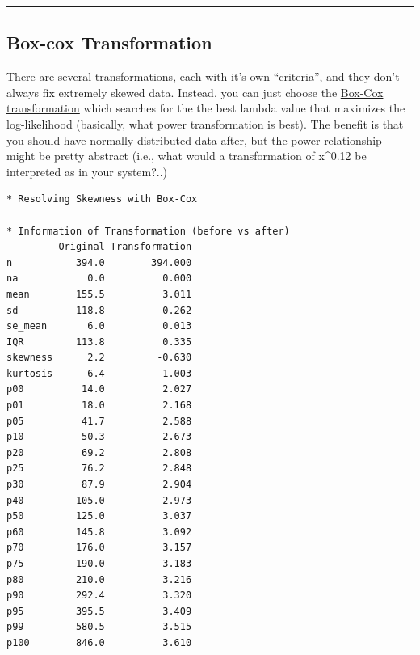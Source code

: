 \documentclass[
  letterpaper,
  DIV=11,
  numbers=noendperiod]{scrreprt}
\newenvironment{Shaded}{\begin{snugshade}}{\end{snugshade}}
\newcommand{\AttributeTok}[1]{\textcolor[rgb]{0.40,0.45,0.13}{#1}}
\newcommand{\FunctionTok}[1]{\textcolor[rgb]{0.28,0.35,0.67}{#1}}
\newcommand{\NormalTok}[1]{\textcolor[rgb]{0.00,0.23,0.31}{#1}}
\newcommand{\OtherTok}[1]{\textcolor[rgb]{0.00,0.23,0.31}{#1}}
\newcommand{\SpecialCharTok}[1]{\textcolor[rgb]{0.37,0.37,0.37}{#1}}
\newcommand{\StringTok}[1]{\textcolor[rgb]{0.13,0.47,0.30}{#1}}
\begin{document}
\begin{center}\rule{0.5\linewidth}{0.5pt}\end{center}

\hypertarget{box-cox-transformation}{%
\subsection{Box-cox Transformation}\label{box-cox-transformation}}

There are several transformations, each with it's own ``criteria'', and
they don't always fix extremely skewed data. Instead, you can just
choose the
\href{https://en.wikipedia.org/wiki/Box\%E2\%80\%93Cox_distribution}{Box-Cox
transformation} which searches for the the best lambda value that
maximizes the log-likelihood (basically, what power transformation is
best). The benefit is that you should have normally distributed data
after, but the power relationship might be pretty abstract (i.e., what
would a transformation of x\^{}0.12 be interpreted as in your system?..)

\begin{Shaded}
\end{Shaded}

\begin{verbatim}
* Resolving Skewness with Box-Cox

* Information of Transformation (before vs after)
         Original Transformation
n           394.0        394.000
na            0.0          0.000
mean        155.5          3.011
sd          118.8          0.262
se_mean       6.0          0.013
IQR         113.8          0.335
skewness      2.2         -0.630
kurtosis      6.4          1.003
p00          14.0          2.027
p01          18.0          2.168
p05          41.7          2.588
p10          50.3          2.673
p20          69.2          2.808
p25          76.2          2.848
p30          87.9          2.904
p40         105.0          2.973
p50         125.0          3.037
p60         145.8          3.092
p70         176.0          3.157
p75         190.0          3.183
p80         210.0          3.216
p90         292.4          3.320
p95         395.5          3.409
p99         580.5          3.515
p100        846.0          3.610
\end{verbatim}
\end{document}
